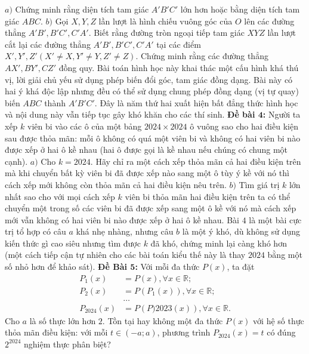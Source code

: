 \begin{multicols}{2}
	\vskip 0.1cm
	$a)$ Chứng minh rằng diện tích tam giác $A'B'C'$ lớn hơn hoặc bằng diện tích tam giác $ABC$.
	\vskip 0.1cm
	$b)$ Gọi $X,Y,Z$ lần lượt là hình chiếu vuông góc của $O$ lên các đường thẳng $A'B',B'C', C'A'$. Biết rằng đường tròn ngoại tiếp tam giác $XYZ$ lần lượt cắt lại các đường thẳng $A'B', B'C', C'A'$ tại các điểm $X',Y',Z' (X' \ne X, Y' \ne Y, Z' \ne Z)$. Chứng minh rằng các đường thẳng $AX', BY', CZ'$ đồng quy.
	\vskip 0.1cm
	Bài toán hình học này khai thác một cấu hình khá thú vị, lời giải chủ yếu sử dụng phép biến đổi góc, tam giác đồng dạng. Bài này có hai ý khá độc lập nhưng đều có thể sử dụng chung phép đồng dạng (vị tự quay) biến $ABC$ thành $A'B'C'$. Đây là năm thứ hai xuất hiện bất đẳng thức hình học và nội dung này vẫn tiếp tục gây khó khăn cho các thí sinh. 
	\vskip 0.1cm
	\textbf{\color{cackithi}Đề bài $\pmb4$:} Người ta xếp $k$ viên bi vào các ô của một bảng $2024 \times 2024$ ô vuông sao cho hai điều kiện sau được thỏa mãn: mỗi ô không có quá một viên bi và không có hai viên bi nào được xếp ở hai ô kề nhau (hai ô được gọi là kề nhau nếu chúng có chung một cạnh).
	\vskip 0.1cm
	$a)$ Cho $k = 2024$. Hãy chỉ ra một cách xếp thỏa mãn cả hai điều kiện trên mà khi chuyển bất kỳ viên bi đã được xếp nào sang một ô tùy ý kề với nó thì cách xếp mới không còn thỏa mãn cả hai điều kiện nêu trên.
	\vskip 0.1cm
	$b)$ Tìm giá trị $k$ lớn nhất sao cho với mọi cách xếp $k$ viên bi thỏa mãn hai điều kiện trên ta có thể chuyển một trong số các viên bi đã được xếp sang một ô kề với nó mà cách xếp mới vẫn không có hai viên bi nào được xếp ở hai ô kề nhau.
	\vskip 0.1cm
	Bài $4$ là một bài cực trị tổ hợp có câu $a$ khá nhẹ nhàng, nhưng câu $b$ là một ý khó, dù không sử dụng kiến thức gì cao siêu nhưng tìm được $k$ đã khó, chứng minh lại càng khó hơn (một cách tiếp cận tự nhiên cho các bài toán kiểu thế này là thay $2024$ bằng một số nhỏ hơn để khảo sát). 
	\vskip 0.1cm
	\textbf{\color{cackithi}Đề Bài $\pmb5$:} Với mỗi đa thức $P(x)$, ta đặt 
	\begin{align*}
		P_1(x) &= P(x), \forall x\in \mathbb{R};\\
		P_2(x) &= P\left(P_1(x)\right), \forall x\in \mathbb{R};\\
		&\ldots\\
		P_{2024}(x)&= P\left(P){2023}(x)\right), \forall x \in \mathbb{R}.
	\end{align*}
	Cho $a$ là số thực lớn hơn $2$. Tồn tại hay không một đa thức $P(x)$ với hệ số thực thỏa mãn điều kiện: với mỗi $t\in (-a;a)$, phương trình $P_{2024} (x) = t$ có đúng $2^{2024}$ nghiệm thực phân biệt?

\end{multicols}
